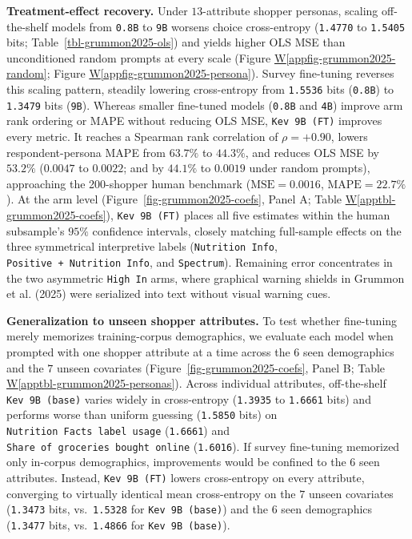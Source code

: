 \documentclass[
  11pt,
  letterpaper,
]{article}
\newcommand*\quartoapptblref[1]{Table \hyperref[#1]{W\ref{#1}}}
\newcommand*\quartoappfigref[1]{Figure \hyperref[#1]{W\ref{#1}}}
\begin{document}
\textbf{Treatment-effect recovery.} Under \(13\)-attribute shopper
personas, scaling off-the-shelf models from \texttt{0.8B} to \texttt{9B}
worsens choice cross-entropy (\texttt{1.4770} to \texttt{1.5405} bits;
Table~\ref{tbl-grummon2025-ols}) and yields higher OLS MSE than
unconditioned random prompts at every scale
(\quartoappfigref{appfig-grummon2025-random};
\quartoappfigref{appfig-grummon2025-persona}). Survey fine-tuning
reverses this scaling pattern, steadily lowering cross-entropy from
\texttt{1.5536} bits (\texttt{0.8B}) to \texttt{1.3479} bits
(\texttt{9B}). Whereas smaller fine-tuned models (\texttt{0.8B} and
\texttt{4B}) improve arm rank ordering or MAPE without reducing OLS MSE,
\texttt{Kev\ 9B\ (FT)} improves every metric. It reaches a Spearman rank
correlation of \(\rho = +0.90\), lowers respondent-persona MAPE from
\(63.7\%\) to \(44.3\%\), and reduces OLS MSE by \(53.2\%\) (\(0.0047\)
to \(0.0022\); and by \(44.1\%\) to \(0.0019\) under random prompts),
approaching the 200-shopper human benchmark (\(\mathrm{MSE} = 0.0016\),
\(\mathrm{MAPE} = 22.7\%\)). At the arm level
(Figure~\ref{fig-grummon2025-coefs}, Panel A;
\quartoapptblref{apptbl-grummon2025-coefs}), \texttt{Kev\ 9B\ (FT)}
places all five estimates within the human subsample's \(95\%\)
confidence intervals, closely matching full-sample effects on the three
symmetrical interpretive labels (\texttt{Nutrition\ Info},
\texttt{Positive\ +\ Nutrition\ Info}, and \texttt{Spectrum}). Remaining
error concentrates in the two asymmetric \texttt{High\ In} arms, where
graphical warning shields in Grummon et al. (2025) were serialized into
text without visual warning cues.

\textbf{Generalization to unseen shopper attributes.} To test whether
fine-tuning merely memorizes training-corpus demographics, we evaluate
each model when prompted with one shopper attribute at a time across the
\(6\) seen demographics and the \(7\) unseen covariates
(Figure~\ref{fig-grummon2025-coefs}, Panel B;
\quartoapptblref{apptbl-grummon2025-personas}). Across individual
attributes, off-the-shelf \texttt{Kev\ 9B\ (base)} varies widely in
cross-entropy (\texttt{1.3935} to \texttt{1.6661} bits) and performs
worse than uniform guessing (\texttt{1.5850} bits) on
\texttt{Nutrition\ Facts\ label\ usage} (\texttt{1.6661}) and
\texttt{Share\ of\ groceries\ bought\ online} (\texttt{1.6016}). If
survey fine-tuning memorized only in-corpus demographics, improvements
would be confined to the \(6\) seen attributes. Instead,
\texttt{Kev\ 9B\ (FT)} lowers cross-entropy on every attribute,
converging to virtually identical mean cross-entropy on the \(7\) unseen
covariates (\texttt{1.3473} bits, vs.~\texttt{1.5328} for
\texttt{Kev\ 9B\ (base)}) and the \(6\) seen demographics
(\texttt{1.3477} bits, vs.~\texttt{1.4866} for
\texttt{Kev\ 9B\ (base)}).
\end{document}
